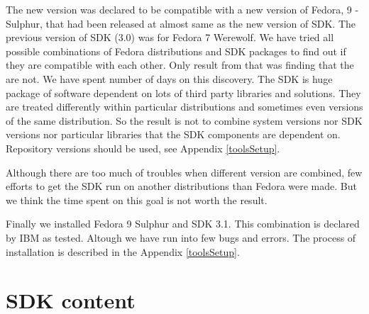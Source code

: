\par
The new version was declared to be compatible with a new version of Fedora, 9 - Sulphur, that had been released at almost same as the new version of SDK.
The previous version of SDK (3.0) was for Fedora 7 Werewolf.
We have tried all possible combinations of Fedora distributions and SDK packages to find out if they are compatible with each other.
Only result from that was finding that the are not.
We have spent number of days on this discovery.
The SDK is huge package of software dependent on lots of third party libraries and solutions.
They are treated differently within particular distributions and sometimes even versions of the same distribution.
So the result is not to combine system versions nor SDK versions nor particular libraries that the SDK components are dependent on.
Repository versions should be used, see Appendix \ref{toolsSetup}.

\par
Although there are too much of troubles when different version are combined, few efforts to get the SDK run on another distributions than Fedora were made.
But we think the time spent on this goal is not worth the result.

\par
Finally we installed Fedora 9 Sulphur and SDK 3.1.
This combination is declared by IBM as tested.
Altough we have run into few bugs and errors.
The process of installation is described in the Appendix \ref{toolsSetup}.

\section {SDK content}

